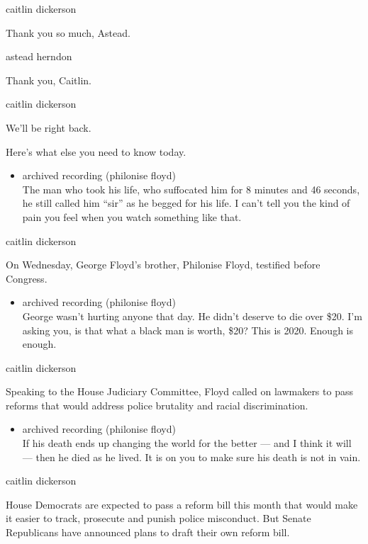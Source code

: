 caitlin dickerson

Thank you so much, Astead.

astead herndon

Thank you, Caitlin.

caitlin dickerson

We'll be right back.

Here's what else you need to know today.

\begin{itemize}
\tightlist
\item
  archived recording (philonise floyd)\\
  The man who took his life, who suffocated him for 8 minutes and 46
  seconds, he still called him ``sir'' as he begged for his life. I
  can't tell you the kind of pain you feel when you watch something like
  that.
\end{itemize}

caitlin dickerson

On Wednesday, George Floyd's brother, Philonise Floyd, testified before
Congress.

\begin{itemize}
\tightlist
\item
  archived recording (philonise floyd)\\
  George wasn't hurting anyone that day. He didn't deserve to die over
  \$20. I'm asking you, is that what a black man is worth, \$20? This is
  2020. Enough is enough.
\end{itemize}

caitlin dickerson

Speaking to the House Judiciary Committee, Floyd called on lawmakers to
pass reforms that would address police brutality and racial
discrimination.

\begin{itemize}
\tightlist
\item
  archived recording (philonise floyd)\\
  If his death ends up changing the world for the better --- and I think
  it will --- then he died as he lived. It is on you to make sure his
  death is not in vain.
\end{itemize}

caitlin dickerson

House Democrats are expected to pass a reform bill this month that would
make it easier to track, prosecute and punish police misconduct. But
Senate Republicans have announced plans to draft their own reform bill.

